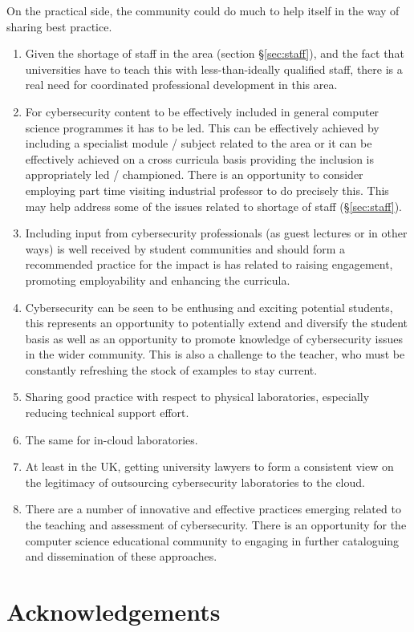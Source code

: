 \documentclass[conference]{IEEEtran}
\begin{document}
On the practical side, the community could do much to help itself in the way of sharing best practice.
\begin{enumerate}
\item Given the shortage of staff in the area (section \S\ref{sec:staff}), and the fact that universities have to teach this with less-than-ideally qualified staff, there is a real need for coordinated professional development in this area.
\item For cybersecurity content to be  effectively included in general computer science programmes it has to be led. This can be effectively achieved by including a specialist module / subject related to the area or it can be effectively achieved on a cross curricula basis providing the inclusion is appropriately led / championed. There is an opportunity to consider employing part time visiting industrial professor to do precisely this. This may help address some of the issues related to shortage of staff (\S\ref{sec:staff}).
\item Including input from cybersecurity professionals (as guest lectures or in other ways) is well received by student communities and should form a recommended practice for the impact is has related to raising engagement, promoting employability and enhancing the curricula.
\item Cybersecurity can be seen to be enthusing and exciting potential students, this represents an opportunity to potentially extend and diversify the student basis as well as an opportunity to promote knowledge of cybersecurity issues in the wider community. This is also a challenge to the teacher, who must be constantly refreshing the stock of examples to stay current.
\item Sharing good practice with respect to physical laboratories, especially reducing technical support effort.
\item The same for in-cloud laboratories.
\item At least in the UK, getting university lawyers to form a consistent view on the legitimacy of outsourcing cybersecurity laboratories to the cloud.
\item There are a number of innovative and effective practices emerging related to the teaching and assessment of cybersecurity. There is an opportunity for the computer science educational community to engaging in further cataloguing and dissemination of these approaches.
\end{enumerate}


\section*{Acknowledgements}
\end{document}
